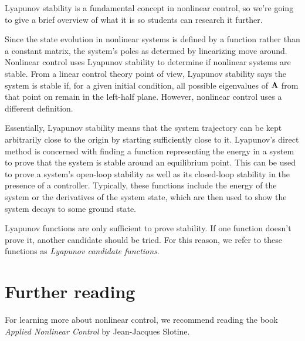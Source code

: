 Lyapunov stability is a fundamental concept in nonlinear control, so we're going
to give a brief overview of what it is so students can research it further.

Since the state evolution in nonlinear systems is defined by a function rather
than a constant matrix, the system's poles as determed by linearizing move
around. Nonlinear control uses Lyapunov stability to determine if nonlinear
systems are stable. From a linear control theory point of view, Lyapunov
stability says the system is stable if, for a given initial condition, all
possible eigenvalues of $\mathbf{A}$ from that point on remain in the left-half
plane. However, nonlinear control uses a different definition.

Essentially, Lyapunov stability means that the system trajectory can be kept
arbitrarily close to the origin by starting sufficiently close to it. Lyapunov's
direct method is concerned with finding a function representing the energy in a
system to prove that the system is stable around an equilibrium point. This can
be used to prove a system's open-loop stability as well as its closed-loop
stability in the presence of a controller. Typically, these functions include
the energy of the system or the derivatives of the system state, which are then
used to show the system decays to some ground state.

Lyapunov functions are only sufficient to prove stability. If one function
doesn't prove it, another candidate should be tried. For this reason, we refer
to these functions as \textit{Lyapunov candidate functions}.

\section{Further reading}

For learning more about nonlinear control, we recommend reading the book
\textit{Applied Nonlinear Control} by Jean-Jacques Slotine.
